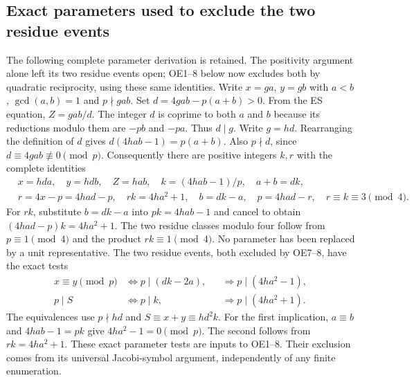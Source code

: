\documentclass[11pt]{article}
\begin{document}
\subsection{Exact parameters used to exclude the two residue events}
The following complete parameter derivation is retained. The positivity
argument alone left its two residue events open; OE1--8 below now
excludes both by quadratic reciprocity, using these same identities.
Write $x=g a$, $y=g b$ with $a<b$, $\gcd(a,b)=1$ and $p\nmid gab$.
Set $d=4gab-p(a+b)>0$. From the ES equation,
$Z=gab/d$. The integer $d$ is coprime to both $a$ and $b$ because
its reductions modulo them are $-pb$ and $-pa$. Thus $d\mid g$.
Write $g=hd$. Rearranging the definition of $d$ gives
$d(4hab-1)=p(a+b)$. Also $p\nmid d$, since
$d\equiv4gab\not\equiv0\pmod p$. Consequently there are positive
integers $k,r$ with the complete identities
\begin{equation}
 \begin{aligned}
 &x=hda,\quad y=hdb,\quad Z=hab,\quad
 k=(4hab-1)/p,\quad a+b=dk,\\
 &r=4x-p=4had-p,\quad rk=4ha^2+1,\quad
 b=dk-a,\quad p=4had-r,\quad r\equiv k\equiv3\pmod4.
 \end{aligned}                                         \tag{PES9}
\end{equation}
For $rk$, substitute $b=dk-a$ into $pk=4hab-1$ and cancel to obtain
$(4had-p)k=4ha^2+1$. The two residue classes modulo four follow
from $p\equiv1\pmod4$ and the product $rk\equiv1\pmod4$.
No parameter has been replaced by a unit representative.
The two residue events, both excluded by OE7--8, have the exact tests
\begin{equation}
 \begin{aligned}
 x\equiv y\pmod p
   &\Longleftrightarrow p\mid(dk-2a),
       &&\Longrightarrow p\mid(4ha^2-1),\\
 p\mid S
   &\Longleftrightarrow p\mid k,
       &&\Longrightarrow p\mid(4ha^2+1).
 \end{aligned}                                         \tag{PES10}
\end{equation}
The equivalences use $p\nmid hd$ and $S\equiv x+y\equiv hd^2k$.
For the first implication, $a\equiv b$ and $4hab-1=pk$ give
$4ha^2-1=0\pmod p$. The second follows from $rk=4ha^2+1$.
These exact parameter tests are inputs to OE1--8. Their exclusion
comes from its universal Jacobi-symbol argument, independently of any
finite enumeration.
\end{document}
